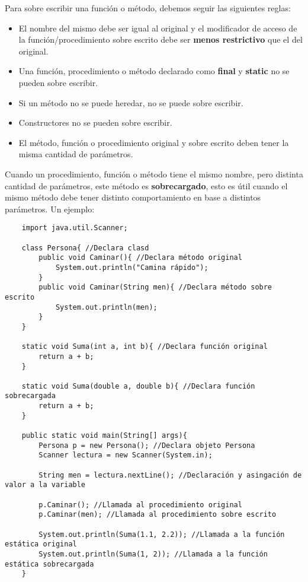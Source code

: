 Para sobre escribir una función o método, debemos seguir las siguientes reglas:
\begin{itemize}
    \item El nombre del mismo debe ser igual al original y el modificador de acceso de la función/procedimiento sobre escrito debe ser \textbf{menos restrictivo} que el del original.
    \item Una función, procedimiento o método declarado como \textbf{final} y \textbf{static} no se pueden sobre escribir.
    \item Si un método no se puede heredar, no se puede sobre escribir.
    \item Constructores no se pueden sobre escribir.
    \item El método, función o procedimiento original y sobre escrito deben tener la misma cantidad de parámetros.
\end{itemize}
Cuando un procedimiento, función o método tiene el mismo nombre, pero distinta cantidad de parámetros, este método es \textbf{sobrecargado}, esto es útil cuando el mismo método debe tener distinto comportamiento en base a distintos parámetros. Un ejemplo:
\begin{lstlisting}
    import java.util.Scanner;
    
    class Persona{ //Declara clasd
        public void Caminar(){ //Declara método original
            System.out.println("Camina rápido");
        }
        public void Caminar(String men){ //Declara método sobre escrito
            System.out.println(men);
        }
    }
    
    static void Suma(int a, int b){ //Declara función original
        return a + b;
    }
    
    static void Suma(double a, double b){ //Declara función sobrecargada
        return a + b;
    }
    
    public static void main(String[] args){
        Persona p = new Persona(); //Declara objeto Persona
        Scanner lectura = new Scanner(System.in);
        
        String men = lectura.nextLine(); //Declaración y asingación de valor a la variable
        
        p.Caminar(); //Llamada al procedimiento original
        p.Caminar(men); //Llamada al procedimiento sobre escrito
        
        System.out.println(Suma(1.1, 2.2)); //Llamada a la función estática original
        System.out.println(Suma(1, 2)); //Llamada a la función estática sobrecargada
    }
\end{lstlisting}


